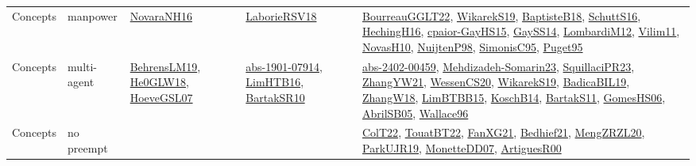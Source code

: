 {\begin{longtable}{lp{3cm}>{\raggedright}p{6cm}>{\raggedright}p{6cm}p{8cm}}
Concepts & manpower & \href{articles/NovaraNH16.pdf}{NovaraNH16}\cite{NovaraNH16} & \href{articles/LaborieRSV18.pdf}{LaborieRSV18}\cite{LaborieRSV18} & \href{articles/BourreauGGLT22.pdf}{BourreauGGLT22}\cite{BourreauGGLT22}, \href{articles/WikarekS19.pdf}{WikarekS19}\cite{WikarekS19}, \href{articles/BaptisteB18.pdf}{BaptisteB18}\cite{BaptisteB18}, \href{papers/SchuttS16.pdf}{SchuttS16}\cite{SchuttS16}, \href{papers/HechingH16.pdf}{HechingH16}\cite{HechingH16}, \href{papers/cpaior-GayHS15.pdf}{cpaior-GayHS15}\cite{cpaior-GayHS15}, \href{papers/GaySS14.pdf}{GaySS14}\cite{GaySS14}, \href{articles/LombardiM12.pdf}{LombardiM12}\cite{LombardiM12}, \href{papers/Vilim11.pdf}{Vilim11}\cite{Vilim11}, \href{articles/NovasH10.pdf}{NovasH10}\cite{NovasH10}, \href{articles/NuijtenP98.pdf}{NuijtenP98}\cite{NuijtenP98}, \href{papers/SimonisC95.pdf}{SimonisC95}\cite{SimonisC95}, \href{papers/Puget95.pdf}{Puget95}\cite{Puget95}\\
Concepts & multi-agent & \href{papers/BehrensLM19.pdf}{BehrensLM19}\cite{BehrensLM19}, \href{papers/He0GLW18.pdf}{He0GLW18}\cite{He0GLW18}, \href{papers/HoeveGSL07.pdf}{HoeveGSL07}\cite{HoeveGSL07} & \href{articles/abs-1901-07914.pdf}{abs-1901-07914}\cite{abs-1901-07914}, \href{papers/LimHTB16.pdf}{LimHTB16}\cite{LimHTB16}, \href{articles/BartakSR10.pdf}{BartakSR10}\cite{BartakSR10} & \href{articles/abs-2402-00459.pdf}{abs-2402-00459}\cite{abs-2402-00459}, \href{papers/Mehdizadeh-Somarin23.pdf}{Mehdizadeh-Somarin23}\cite{Mehdizadeh-Somarin23}, \href{papers/SquillaciPR23.pdf}{SquillaciPR23}\cite{SquillaciPR23}, \href{articles/ZhangYW21.pdf}{ZhangYW21}\cite{ZhangYW21}, \href{papers/WessenCS20.pdf}{WessenCS20}\cite{WessenCS20}, \href{articles/WikarekS19.pdf}{WikarekS19}\cite{WikarekS19}, \href{papers/BadicaBIL19.pdf}{BadicaBIL19}\cite{BadicaBIL19}, \href{articles/ZhangW18.pdf}{ZhangW18}\cite{ZhangW18}, \href{papers/LimBTBB15.pdf}{LimBTBB15}\cite{LimBTBB15}, \href{papers/KoschB14.pdf}{KoschB14}\cite{KoschB14}, \href{articles/BartakS11.pdf}{BartakS11}\cite{BartakS11}, \href{papers/GomesHS06.pdf}{GomesHS06}\cite{GomesHS06}, \href{papers/AbrilSB05.pdf}{AbrilSB05}\cite{AbrilSB05}, \href{articles/Wallace96.pdf}{Wallace96}\cite{Wallace96}\\
Concepts & no preempt &  &  & \href{articles/ColT22.pdf}{ColT22}\cite{ColT22}, \href{papers/TouatBT22.pdf}{TouatBT22}\cite{TouatBT22}, \href{articles/FanXG21.pdf}{FanXG21}\cite{FanXG21}, \href{articles/Bedhief21.pdf}{Bedhief21}\cite{Bedhief21}, \href{articles/MengZRZL20.pdf}{MengZRZL20}\cite{MengZRZL20}, \href{papers/ParkUJR19.pdf}{ParkUJR19}\cite{ParkUJR19}, \href{papers/MonetteDD07.pdf}{MonetteDD07}\cite{MonetteDD07}, \href{articles/ArtiguesR00.pdf}{ArtiguesR00}\cite{ArtiguesR00}\\

\end{longtable}}
